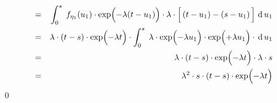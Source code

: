 \begin{eqnarray*}
\\
& = &
	\int_{0}^{s}\;
		f_{\eta_{1}}(u_{1}) \cdot \exp\!\left(\overset{{\color{white}.}}{-}\lambda(t-u_{1})\right)
		\cdot
		\lambda\cdot\left[\,(t-u_{1})\overset{{\color{white}.}}{-}(s-u_{1})\,\right]
		\,\d\,u_{1}
\\
& = &
	\lambda \cdot (t-s) \cdot \exp\!\left(\overset{{\color{white}.}}{-}\lambda t\right)
	\cdot
	\int_{0}^{s}\;
		\lambda \cdot \exp\!\left(\overset{{\color{white}.}}{-}\lambda u_{1}\right)
		\cdot
		\exp\!\left(\overset{{\color{white}.}}{+}\lambda u_{1}\right)
		\cdot
		\,\d\,u_{1}
\\
& \overset{{\color{white}1}}{=} &
	\lambda \cdot (t-s) \cdot \exp\!\left(\overset{{\color{white}.}}{-}\lambda t\right)
	\cdot
	\lambda \cdot s
\\
& \overset{{\color{white}1}}{=} &
	\lambda^{2} \cdot s \cdot (t-s) \cdot \exp\!\left(\overset{{\color{white}.}}{-}\lambda t\right)
\end{eqnarray*}
\qed


\renewcommand{\theenumi}{\roman{enumi}}
\renewcommand{\labelenumi}{\textnormal{(\theenumi)}$\;\;$}

